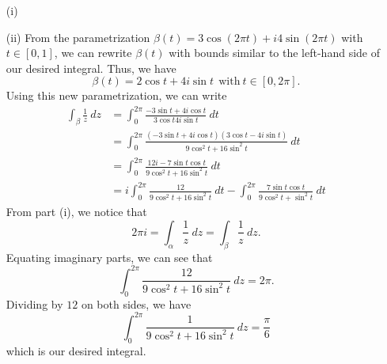 \documentclass[a4paper]{article}
\begin{document}
\begin{solution}[a]
   \begin{enumerate}
       \item[(i)]
       \item[(ii)] From the parametrization \( \beta (t) = 3 \cos (2 \pi t ) + i 4 \sin (2 \pi t) \) with \( t \in [0,1] \), we can rewrite \( \beta(t) \) with bounds similar to the left-hand side of our desired integral. Thus, we have  
           \[  \beta(t) = 2 \cos t + 4 i \sin t \ \ \text{with} \ t \in [0,2\pi]. \]
           Using this new parametrization, we can write
           \begin{align*}
               \int_{ \beta  }^{  } \frac{ 1 }{ z } \ dz &= \int_{ 0 }^{ 2 \pi }   \frac{ -3 \sin t + 4 i \cos t  }{ 3 \cos t  4i \sin t  }  \ dt  \\
                                                         &= \int_{ 0 }^{ 2 \pi  } \frac{ (-3 \sin t + 4 i \cos t ) (3 \cos t - 4i \sin t ) }{ 9 \cos^{2} t + 16 \sin^{2} t  }  \ dt \\
                                                         &= \int_{ 0 }^{ 2\pi  }  \frac{ 12i - 7 \sin t \cos t  }{ 9 \cos^{2} t + 16 \sin^{2}t  }  \ dt \\
                                                         &= i \int_{ 0 }^{ 2\pi  } \frac{ 12 }{ 9 \cos^{2} t + 16 \sin^{2}t  } \ dt - \int_{ 0 }^{ 2\pi  } \frac{ 7 \sin t \cos t  }{ 9 \cos^{2}t + \sin^{2} t  }  \ dt 
           \end{align*}
           From part (i), we notice that 
           \[   2 \pi i = \int_{ \alpha  }^{  } \frac{ 1 }{ z }   \ dz = \int_{ \beta  }^{  }  \frac{ 1 }{ z }  \ dz. \]
           Equating imaginary parts, we can see that
           \[ \int_{ 0 }^{ 2 \pi  } \frac{ 12 }{ 9 \cos^{2}t + 16 \sin^{2} t  }  \ dz = 2 \pi.  \]
           Dividing by \( 12  \) on both sides, we have
           \[  \int_{ 0 }^{ 2 \pi  } \frac{ 1 }{ 9 \cos^{2}t + 16 \sin^{2} t  }  \ dz = \frac{ \pi }{ 6 } \]
           which is our desired integral.
   \end{enumerate} 
\end{solution}
\end{document}
